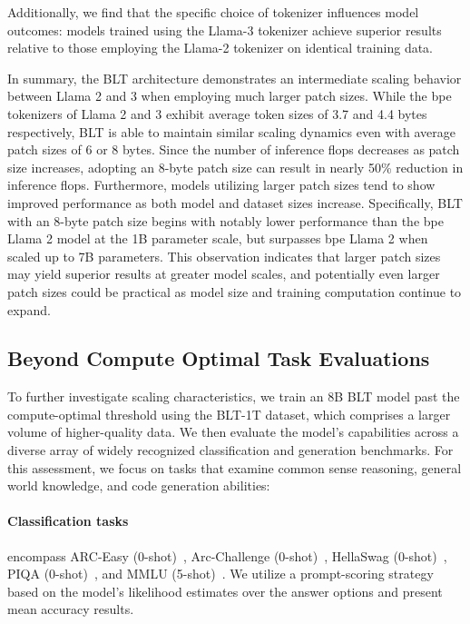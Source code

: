 Additionally, we find that the specific choice of tokenizer influences model outcomes: models trained using the Llama-3 tokenizer achieve superior results relative to those employing the Llama-2 tokenizer on identical training data.

In summary, the {\textsc BLT} architecture demonstrates an intermediate scaling behavior between Llama 2 and 3 when employing much larger patch sizes. While the bpe tokenizers of Llama 2 and 3 exhibit average token sizes of 3.7 and 4.4 bytes respectively, {\textsc BLT} is able to maintain similar scaling dynamics even with average patch sizes of 6 or 8 bytes. Since the number of inference flops decreases as patch size increases, adopting an 8-byte patch size can result in nearly 50\% reduction in inference flops. Furthermore, models utilizing larger patch sizes tend to show improved performance as both model and dataset sizes increase. Specifically, {\textsc BLT} with an 8-byte patch size begins with notably lower performance than the bpe Llama 2 model at the 1B parameter scale, but surpasses bpe Llama 2 when scaled up to 7B parameters. This observation indicates that larger patch sizes may yield superior results at greater model scales, and potentially even larger patch sizes could be practical as model size and training computation continue to expand.

\subsection{Beyond Compute Optimal Task Evaluations}
\label{section:evals}
To further investigate scaling characteristics, we train an 8B {\textsc BLT} model past the compute-optimal threshold using the {\textsc BLT}-1T dataset, which comprises a larger volume of higher-quality data. We then evaluate the model’s capabilities across a diverse array of widely recognized classification and generation benchmarks. For this assessment, we focus on tasks that examine common sense reasoning, general world knowledge, and code generation abilities:
\paragraph{Classification tasks} encompass ARC-Easy (0-shot)~\citep{Eval_ARC}, Arc-Challenge (0-shot)~\citep{Eval_ARC}, HellaSwag (0-shot)~\citep{Eval_hellaswag}, PIQA (0-shot)~\citep{Eval_piqa}, and MMLU (5-shot)~\citep{hendrycks2020measuring}. We utilize a prompt-scoring strategy based on the model’s likelihood estimates over the answer options and present mean accuracy results.
